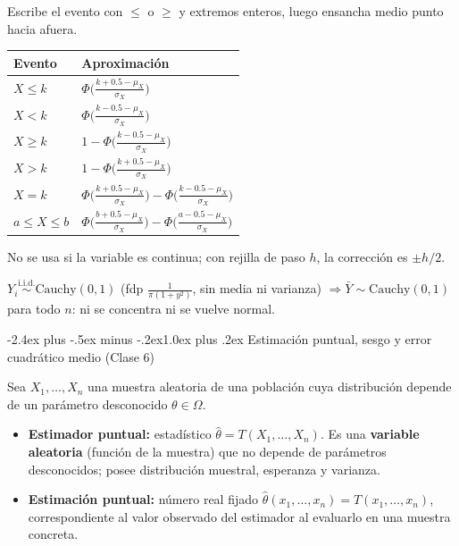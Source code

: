 \documentclass[10pt,a4paper]{article}
\makeatletter
\newcommand{\iid}{\overset{\text{i.i.d.}}{\sim}}
\renewcommand\section{\@startsection{section}{1}{0pt}%
  {-2.4ex plus -.5ex minus -.2ex}{1.0ex plus .2ex}%
  {\normalfont\large\bfseries\color{seccolor}}}
\makeatother
\begin{document}
\begin{defbox}[frametitle={Corrección por continuidad ($X$ entera)}]
Escribe el evento con $\le$ o $\ge$ y extremos enteros, luego ensancha medio
punto hacia afuera.

\smallskip
\begingroup\footnotesize
\setlength{\tabcolsep}{6pt}
\noindent
\begin{tabular}{@{}l p{11cm}@{}}
\toprule
\textbf{Evento} & \textbf{Aproximación}\\
\midrule
$X\le k$ & $\Phi\!\big(\frac{k+0.5-\mu_X}{\sigma_X}\big)$\\
$X<k$ & $\Phi\!\big(\frac{k-0.5-\mu_X}{\sigma_X}\big)$\\
$X\ge k$ & $1-\Phi\!\big(\frac{k-0.5-\mu_X}{\sigma_X}\big)$\\
$X>k$ & $1-\Phi\!\big(\frac{k+0.5-\mu_X}{\sigma_X}\big)$\\
$X=k$ & $\Phi\!\big(\frac{k+0.5-\mu_X}{\sigma_X}\big)-\Phi\!\big(\frac{k-0.5-\mu_X}{\sigma_X}\big)$\\
$a\le X\le b$ & $\Phi\!\big(\frac{b+0.5-\mu_X}{\sigma_X}\big)-\Phi\!\big(\frac{a-0.5-\mu_X}{\sigma_X}\big)$\\
\bottomrule
\end{tabular}
\endgroup

No se usa si la variable es continua; con rejilla de paso $h$, la corrección es
$\pm h/2$.
\end{defbox}

\begin{warnbox}[frametitle={Sin varianza finita no hay TLC}]
$Y_i\iid\text{Cauchy}(0,1)$ (fdp $\frac{1}{\pi(1+y^2)}$, sin media ni varianza)
$\Rightarrow \bar Y\sim\text{Cauchy}(0,1)$ para todo $n$: ni se concentra ni se
vuelve normal.
\end{warnbox}

\section{Estimación puntual, sesgo y error cuadrático medio \textmd{(Clase 6)}}

\begin{defbox}[frametitle={Estimador puntual frente a estimación puntual}]
Sea $X_1,\dots,X_n$ una muestra aleatoria de una población cuya distribución depende de un parámetro desconocido $\theta\in\Omega$.
\begin{itemize}
  \item \textbf{Estimador puntual:} estadístico $\hat\theta = T(X_1,\dots,X_n)$. Es una \textbf{variable aleatoria} (función de la muestra) que no depende de parámetros desconocidos; posee distribución muestral, esperanza y varianza.
  \item \textbf{Estimación puntual:} número real fijado $\hat\theta(x_1,\dots,x_n) = T(x_1,\dots,x_n)$, correspondiente al valor observado del estimador al evaluarlo en una muestra concreta.
\end{itemize}
\end{defbox}
\end{document}
